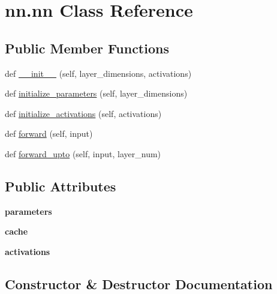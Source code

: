 \hypertarget{classnn_1_1nn}{}\section{nn.\+nn Class Reference}
\label{classnn_1_1nn}
\subsection*{Public Member Functions}
\begin{DoxyCompactItemize}
\item 
def \hyperlink{classnn_1_1nn_ad7304c7932970a07bf2869e97b79e0b5}{\+\_\+\+\_\+init\+\_\+\+\_\+} (self, layer\+\_\+dimensions, activations)
\item 
def \hyperlink{classnn_1_1nn_a9821fed1369b4d709fe297fe9e07d97b}{initialize\+\_\+parameters} (self, layer\+\_\+dimensions)
\item 
def \hyperlink{classnn_1_1nn_a1f6dba2cb835e0d723f39106534062a7}{initialize\+\_\+activations} (self, activations)
\item 
def \hyperlink{classnn_1_1nn_ace3e99e16bb7d1256d4d1fbf7e6cebd0}{forward} (self, input)
\item 
def \hyperlink{classnn_1_1nn_afd6fb3877eeb0ddd889484caea7ca6e3}{forward\+\_\+upto} (self, input, layer\+\_\+num)
\end{DoxyCompactItemize}
\subsection*{Public Attributes}
\begin{DoxyCompactItemize}
\item 
\mbox{\label{classnn_1_1nn_a69da89bd6d17dbc8596ab586b7678237}} 
{\bfseries parameters}
\item 
\mbox{\label{classnn_1_1nn_a1f75a6242fc9ee82ca2632e18979b4d3}} 
{\bfseries cache}
\item 
\mbox{\label{classnn_1_1nn_acb7fb4cc0db120b007ef1ab1f82d7ba0}} 
{\bfseries activations}
\end{DoxyCompactItemize}


\subsection{Constructor \& Destructor Documentation}
\mbox{\label{classnn_1_1nn_ad7304c7932970a07bf2869e97b79e0b5}} 
